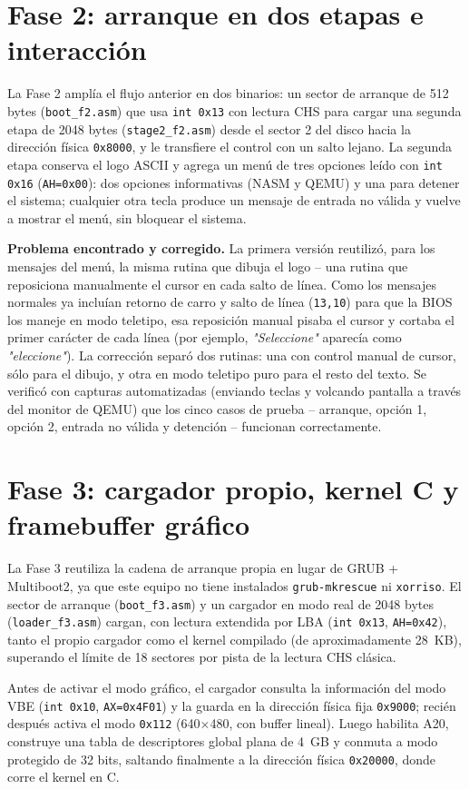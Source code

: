\documentclass[11pt,a4paper]{article}
\begin{document}
\section{Fase 2: arranque en dos etapas e interacción}
La Fase 2 amplía el flujo anterior en dos binarios: un sector de arranque de 512 bytes
(\texttt{boot\_f2.asm}) que usa \texttt{int 0x13} con lectura CHS para cargar una segunda
etapa de 2048 bytes (\texttt{stage2\_f2.asm}) desde el sector 2 del disco hacia la dirección
física \texttt{0x8000}, y le transfiere el control con un salto lejano. La segunda etapa
conserva el logo ASCII y agrega un menú de tres opciones leído con \texttt{int 0x16}
(\texttt{AH=0x00}): dos opciones informativas (NASM y QEMU) y una para detener el sistema;
cualquier otra tecla produce un mensaje de entrada no válida y vuelve a mostrar el menú, sin
bloquear el sistema.

\textbf{Problema encontrado y corregido.} La primera versión reutilizó, para los mensajes del
menú, la misma rutina que dibuja el logo -- una rutina que reposiciona manualmente el cursor
en cada salto de línea. Como los mensajes normales ya incluían retorno de carro y salto de
línea (\texttt{13,10}) para que la BIOS los maneje en modo teletipo, esa reposición manual
pisaba el cursor y cortaba el primer carácter de cada línea (por ejemplo, \emph{"Seleccione"}
aparecía como \emph{"eleccione"}). La corrección separó dos rutinas: una con control manual de
cursor, sólo para el dibujo, y otra en modo teletipo puro para el resto del texto. Se verificó
con capturas automatizadas (enviando teclas y volcando pantalla a través del monitor de QEMU)
que los cinco casos de prueba -- arranque, opción 1, opción 2, entrada no válida y detención --
funcionan correctamente.

\section{Fase 3: cargador propio, kernel C y framebuffer gráfico}
La Fase 3 reutiliza la cadena de arranque propia en lugar de GRUB + Multiboot2, ya que este
equipo no tiene instalados \texttt{grub-mkrescue} ni \texttt{xorriso}. El sector de arranque
(\texttt{boot\_f3.asm}) y un cargador en modo real de 2048 bytes (\texttt{loader\_f3.asm})
cargan, con lectura extendida por LBA (\texttt{int 0x13}, \texttt{AH=0x42}), tanto el propio
cargador como el kernel compilado (de aproximadamente 28~KB), superando el límite de 18
sectores por pista de la lectura CHS clásica.

Antes de activar el modo gráfico, el cargador consulta la información del modo VBE
(\texttt{int 0x10}, \texttt{AX=0x4F01}) y la guarda en la dirección física fija
\texttt{0x9000}; recién después activa el modo \texttt{0x112} (640$\times$480, con buffer
lineal). Luego habilita A20, construye una tabla de descriptores global plana de 4~GB y
conmuta a modo protegido de 32 bits, saltando finalmente a la dirección física
\texttt{0x20000}, donde corre el kernel en C.
\end{document}
